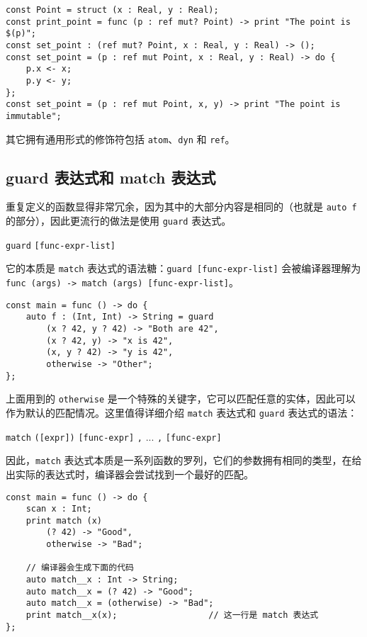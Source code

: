 \begin{lstlisting}
const Point = struct (x : Real, y : Real);
const print_point = func (p : ref mut? Point) -> print "The point is $(p)";
const set_point : (ref mut? Point, x : Real, y : Real) -> ();
const set_point = (p : ref mut Point, x : Real, y : Real) -> do {
	p.x <- x;
	p.y <- y;
};
const set_point = (p : ref mut Point, x, y) -> print "The point is immutable";
\end{lstlisting}

其它拥有通用形式的修饰符包括 \lstinline!atom!、\lstinline!dyn! 和 \lstinline!ref!。

\subsection{guard 表达式和 match 表达式}

重复定义的函数显得非常冗余，因为其中的大部分内容是相同的（也就是 \lstinline!auto f! 的部分），因此更流行的做法是使用 \lstinline!guard! 表达式。

\begin{grammar}
	\lstinline!guard! \texttt{[func-expr-list]}
\end{grammar}

它的本质是 \lstinline!match! 表达式的语法糖：\texttt{guard [func-expr-list]} 会被编译器理解为 \texttt{func (args) -> match (args) [func-expr-list]}。

\begin{lstlisting}
const main = func () -> do {
    auto f : (Int, Int) -> String = guard
        (x ? 42, y ? 42) -> "Both are 42",
        (x ? 42, y) -> "x is 42",
        (x, y ? 42) -> "y is 42",
        otherwise -> "Other";
};
\end{lstlisting}

上面用到的 \lstinline!otherwise! 是一个特殊的关键字，它可以匹配任意的实体，因此可以作为默认的匹配情况。这里值得详细介绍 \lstinline!match! 表达式和 \lstinline!guard! 表达式的语法：

\begin{grammar} \label{grm:match-expression}
    \lstinline!match! \texttt{([expr])} \texttt{[func-expr]} \lstinline!,! ... \lstinline!,! \texttt{[func-expr]}
\end{grammar}

因此，\lstinline!match! 表达式本质是一系列函数的罗列，它们的参数拥有相同的类型，在给出实际的表达式时，编译器会尝试找到一个最好的匹配。

\begin{lstlisting}
const main = func () -> do {
    scan x : Int;
    print match (x)
        (? 42) -> "Good",
        otherwise -> "Bad";

    // 编译器会生成下面的代码
    auto match__x : Int -> String;
    auto match__x = (? 42) -> "Good";
    auto match__x = (otherwise) -> "Bad";
    print match__x(x);					// 这一行是 match 表达式
};
\end{lstlisting}

